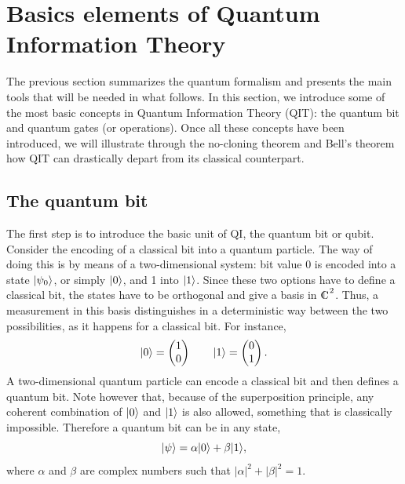 \documentclass[a4paper]{article}
\def\0{\overline{0}}
\def\compl{\begin{picture}(8,8)\put(0,0){C}\put(3,0.3){\line(0,1){7}}\end{picture}}
\begin{document}
\section{Basics elements of Quantum Information Theory}

The previous section summarizes the quantum formalism and presents
the main tools that will be needed in what follows. In this section,
we introduce some of the most basic concepts in Quantum Information Theory (QIT): the quantum bit and quantum
gates (or operations). Once all these concepts have been introduced,
we will illustrate through the no-cloning theorem and Bell's theorem how QIT can drastically depart from its classical counterpart.


\subsection{The quantum bit}

The first step is to introduce the basic unit of QI,
the quantum bit or qubit.
Consider the encoding of a classical bit into a quantum particle.
The way of doing this is by means of a two-dimensional system: bit
value 0 is encoded into a state $|\psi_0\rangle$, or simply
$|0\rangle$, and 1 into $|1\rangle$. Since these two options have to
define a classical bit, the states have to be orthogonal and give
a basis in $\compl^2$. Thus, a measurement in this basis
distinguishes in a deterministic way between the two
possibilities, as it happens for a classical bit. For instance,
\begin{equation}\label{2basis}
    |0\rangle=\begin{pmatrix}1\\0\\\end{pmatrix}\quad\quad
    |1\rangle=\begin{pmatrix}0\\1\\\end{pmatrix} .
\end{equation}
A two-dimensional quantum particle can encode a classical bit and
then defines a quantum bit. Note however that, because of the
superposition principle, any coherent combination of $|0\rangle$ and
$|1\rangle$ is also allowed, something that is classically
impossible. Therefore a quantum bit can be in any state,
\begin{equation}\label{qubit}
    |\psi\rangle=\alpha|0\rangle+\beta|1\rangle ,
\end{equation}
where $\alpha$ and $\beta$ are complex numbers such that
$|\alpha|^2+|\beta|^2=1$.
\end{document}
